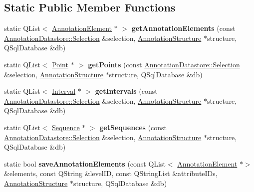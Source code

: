 \subsection*{Static Public Member Functions}
\begin{DoxyCompactItemize}
\item 
\mbox{\label{class_s_q_l_serialiser_annotation_a1d0541c8492166d680515169183662bd}} 
static Q\+List$<$ \hyperlink{class_annotation_element}{Annotation\+Element} $\ast$ $>$ {\bfseries get\+Annotation\+Elements} (const \hyperlink{class_annotation_datastore_1_1_selection}{Annotation\+Datastore\+::\+Selection} \&selection, \hyperlink{class_annotation_structure}{Annotation\+Structure} $\ast$structure, Q\+Sql\+Database \&db)
\item 
\mbox{\label{class_s_q_l_serialiser_annotation_ae874653ef486e25efe18bd8a46ababd5}} 
static Q\+List$<$ \hyperlink{class_point}{Point} $\ast$ $>$ {\bfseries get\+Points} (const \hyperlink{class_annotation_datastore_1_1_selection}{Annotation\+Datastore\+::\+Selection} \&selection, \hyperlink{class_annotation_structure}{Annotation\+Structure} $\ast$structure, Q\+Sql\+Database \&db)
\item 
\mbox{\label{class_s_q_l_serialiser_annotation_aaf0ba6570e4c3a985a068383a2a220fa}} 
static Q\+List$<$ \hyperlink{class_interval}{Interval} $\ast$ $>$ {\bfseries get\+Intervals} (const \hyperlink{class_annotation_datastore_1_1_selection}{Annotation\+Datastore\+::\+Selection} \&selection, \hyperlink{class_annotation_structure}{Annotation\+Structure} $\ast$structure, Q\+Sql\+Database \&db)
\item 
\mbox{\label{class_s_q_l_serialiser_annotation_a714f82a0f9550cf9949e32afaddad288}} 
static Q\+List$<$ \hyperlink{class_sequence}{Sequence} $\ast$ $>$ {\bfseries get\+Sequences} (const \hyperlink{class_annotation_datastore_1_1_selection}{Annotation\+Datastore\+::\+Selection} \&selection, \hyperlink{class_annotation_structure}{Annotation\+Structure} $\ast$structure, Q\+Sql\+Database \&db)
\item 
\mbox{\label{class_s_q_l_serialiser_annotation_a5f46dbfcefff115593b3334ab8a282e1}} 
static bool {\bfseries save\+Annotation\+Elements} (const Q\+List$<$ \hyperlink{class_annotation_element}{Annotation\+Element} $\ast$$>$ \&elements, const Q\+String \&level\+ID, const Q\+String\+List \&attribute\+I\+Ds, \hyperlink{class_annotation_structure}{Annotation\+Structure} $\ast$structure, Q\+Sql\+Database \&db)
$$
\end{DoxyCompactItemize}
